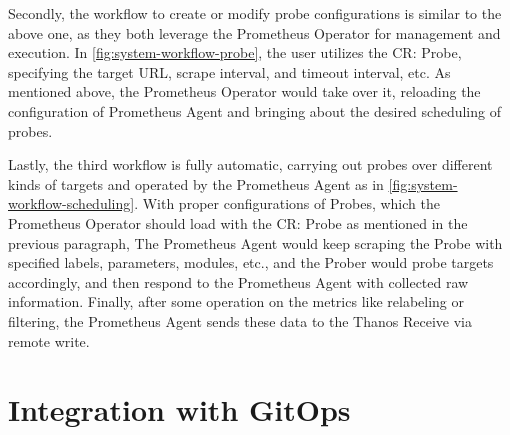 Secondly, the workflow to create or modify probe configurations is similar to the above one, as they both leverage the Prometheus Operator for management and execution. In \autoref{fig:system-workflow-probe}, the user utilizes the \ac{CR}: Probe, specifying the target \ac{URL}, scrape interval, and timeout interval, etc. As mentioned above, the Prometheus Operator would take over it, reloading the configuration of Prometheus Agent and bringing about the desired scheduling of probes. 

Lastly, the third workflow is fully automatic, carrying out probes over different kinds of targets and operated by the Prometheus Agent as in \autoref{fig:system-workflow-scheduling}. With proper configurations of Probes, which the Prometheus Operator should load with the \ac{CR}: Probe as mentioned in the previous paragraph, The Prometheus Agent would keep scraping the Probe with specified labels, parameters, modules, etc., and the Prober would probe targets accordingly, and then respond to the Prometheus Agent with collected raw information. Finally, after some operation on the metrics like relabeling or filtering, the Prometheus Agent sends these data to the Thanos Receive via remote write. 

\section{Integration with GitOps}

